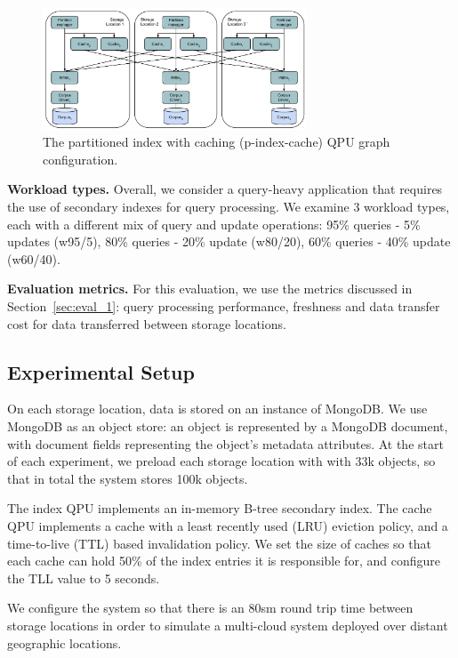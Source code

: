 \begin{figure}[H]
\centering
  \includegraphics[width=0.7\textwidth]{./figures/evaluation/p_index_cache.pdf}
  \caption{The partitioned index with caching (p-index-cache) QPU graph configuration.}
  \label{fig:p_index_cache}
\end{figure}

\bigskip
\noindent
\textbf{Workload types.}
Overall, we consider a query-heavy application that requires the use of secondary indexes for query processing.
We examine 3 workload types, each with a different mix of query and update operations:
95\% queries - 5\% updates (w95/5), 80\% queries - 20\% update (w80/20),
60\% queries - 40\% update (w60/40).

\bigskip
\noindent
\textbf{Evaluation metrics.}
For this evaluation, we use the metrics discussed in Section~\ref{sec:eval_1}:
query processing performance, freshness and data transfer cost for data transferred between storage locations.

\subsection{Experimental Setup}
On each storage location, data is stored on an instance of MongoDB.
We use MongoDB as an object store:
an object is represented by a MongoDB document, with document fields representing the object's metadata attributes.
At the start of each experiment, we preload each storage location with with 33k objects,
so that in total the system stores 100k objects.

The index QPU implements an in-memory B-tree secondary index.
The cache QPU implements a cache with a least recently used (LRU) eviction policy,
and a time-to-live (TTL) based invalidation policy.
We set the size of caches so that each cache can hold 50\% of the index entries it is responsible for,
and configure the TLL value to 5 seconds.

We configure the system so that there is an 80sm round trip time between storage locations in order to
simulate a multi-cloud system deployed over distant geographic locations.

